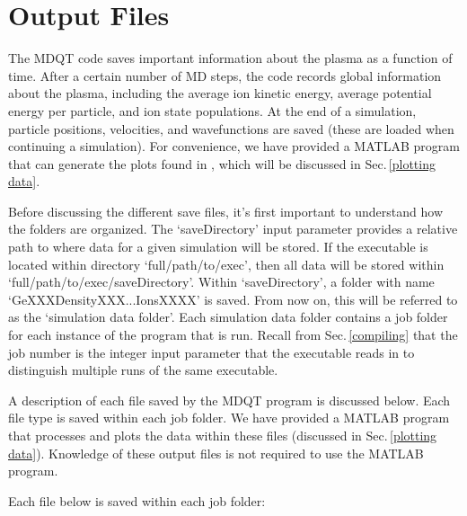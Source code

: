 \documentclass{article}
\begin{document}
	\section{Output Files} \label{output files}
	
	The MDQT code saves important information about the plasma as a function of time. 
	After a certain number of MD steps, the code records global information about the plasma, including the average ion kinetic energy, average potential energy per particle, and ion state populations. At the end of a simulation, particle positions, velocities, and wavefunctions are saved (these are loaded when continuing a simulation).
	For convenience, we have provided a MATLAB program that can generate the plots found in \cite{glk2019}, which will be discussed in Sec.\,\ref{plotting data}.
	
	Before discussing the different save files, it's first important to understand how the folders are organized. The `saveDirectory' input parameter provides a relative path to where data for a given simulation will be stored. If the executable is located within directory `full/path/to/exec', then all data will be stored within `full/path/to/exec/saveDirectory'. Within `saveDirectory', a folder with name `GeXXXDensityXXX...IonsXXXX' is saved. From now on, this will be referred to as the `simulation data folder'. Each simulation data folder contains a job folder for each instance of the program that is run. Recall from Sec.\,\ref{compiling} that the job number is the integer input parameter that the executable reads in to distinguish multiple runs of the same executable.
	
	A description of each file saved by the MDQT program is discussed below. Each file type is saved within each job folder. We have provided a MATLAB program that processes and plots the data within these files (discussed in Sec.\,\ref{plotting data}). Knowledge of these output files is not required to use the MATLAB program.
	
	Each file below is saved within each job folder:
	
\end{document}
